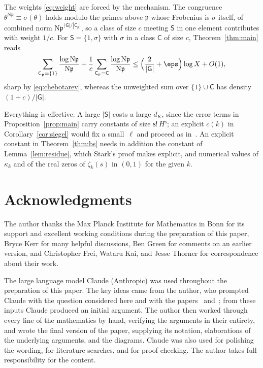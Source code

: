 \documentclass[11pt, reqno, twoside, letterpaper]{amsart}
\newcommand{\Nm}{\mathrm{N}}
\newcommand{\fp}{\mathfrak{p}}
\newcommand{\auxp}{\ell}
\newcommand{\wgt}{H}
\newcommand{\XX}{X}
\newcommand{\galKk}{\mathsf{G}}
\newcommand{\Kf}{K}
\newcommand{\Sset}{\mathsf{S}}
\newcommand{\nS}{\mathsf{s}}
\newcommand{\cls}{\mathsf{C}}
\begin{document}
\begin{remark}
The weights \eqref{eq:weight} are forced by the mechanism. The
congruence $\theta^{\Nm\fp}\equiv\sigma(\theta)$ holds modulo the
primes above $\fp$ whose Frobenius is $\sigma$ itself, of combined
norm $\Nm\fp^{\,|\galKk|/|\cls_\fp|}$, so a class of size $c$ meeting
$\Sset$ in one element contributes with weight $1/c$. For
$\Sset=\{1,\sigma\}$ with $\sigma$ in a class $\cls$ of size $c$,
Theorem~\ref{thm:main} reads
\[
\sum_{\cls_\fp=\{1\}}\frac{\log\Nm\fp}{\Nm\fp}
+\frac1c\sum_{\cls_\fp=\cls}\frac{\log\Nm\fp}{\Nm\fp}
\le\Big(\frac{2}{|\galKk|}+\eps\Big)\log\XX+O(1),
\]
sharp by \eqref{eq:chebotarev}, whereas the unweighted sum over
$\{1\}\cup\cls$ has density $(1+c)/|\galKk|$.
\end{remark}

\begin{remark}
Everything is effective. A large $|\Sset|$ costs a large $d_\Kf$,
since the error terms in Proposition~\ref{prop:main} carry constants
of size $\nS!\,\wgt^{\nS}$; an explicit $c(k)$ in
Corollary~\ref{cor:siegel} would fix a small~$\auxp$ and proceed as
in~\cite{Ba}. An explicit constant in Theorem~\ref{thm:bs} needs
in addition the constant of Lemma~\ref{lem:residue}, which Stark's
proof makes explicit, and numerical values of $\kappa_k$ and of the
real zeros of $\zeta_k(s)$ in $(0,1)$ for the given $k$.
\end{remark}

\section*{Acknowledgments}

The author thanks the Max Planck Institute for Mathematics in
Bonn for its support and excellent working conditions during the
preparation of this paper, Bryce Kerr for many helpful
discussions, Ben Green for comments on an earlier version, and
Christopher Frei, Wataru Kai, and Jesse Thorner for correspondence
about their work.

The large language model Claude (Anthropic) was used throughout the
preparation of this paper. The key ideas came from the author, who
prompted Claude with the question considered here and with the
papers~\cite{Ba} and~\cite{Ke}; from these inputs Claude produced an
initial argument. The author then worked through every line of the
mathematics by hand, verifying the arguments in their entirety, and
wrote the final version of the paper, supplying its notation,
elaborations of the underlying arguments, and the diagrams. Claude
was also used for polishing the wording, for literature searches, and
for proof checking. The author takes full responsibility for the
content.
\end{document}
